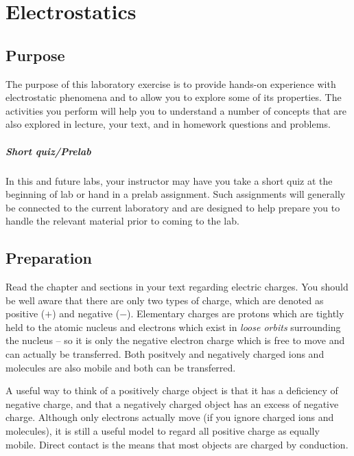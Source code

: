 \chapter{Electrostatics}
\begin{multicols}{2}
\section{Purpose}
The purpose of this laboratory exercise is to provide hands-on experience with electrostatic phenomena and to allow you to explore some of its properties.  The activities you perform will help you to understand a number of concepts that are also explored in lecture, your text, and in homework questions and problems.
\paragraph{Short quiz/Prelab}
  In this and future labs, your instructor may have you take a short quiz at the beginning of lab or hand in a prelab assignment.  Such assignments  will generally be connected to the current laboratory and are designed to help prepare you to handle the relevant material prior to coming to the lab.
\section{Preparation}
Read the chapter and sections in your text regarding electric charges. You should be well aware that there are only two types of charge, which are denoted as positive ($+$) and negative ($-$). Elementary charges are protons which are tightly held to the atomic nucleus and electrons which exist in \emph{loose orbits} surrounding the nucleus -- so it is only the negative electron charge which is free to move and can actually be transferred. Both positvely and negatively charged ions and molecules are also mobile and both can be transferred. 

A useful way to think of a positively charge object is that it has a deficiency of negative charge, and that a negatively charged object has an excess of negative charge. Although only electrons actually move (if you ignore charged ions and molecules), it is still a useful model to regard all positive charge as equally mobile. Direct contact is the means that most objects are charged by conduction.


\end{multicols}
